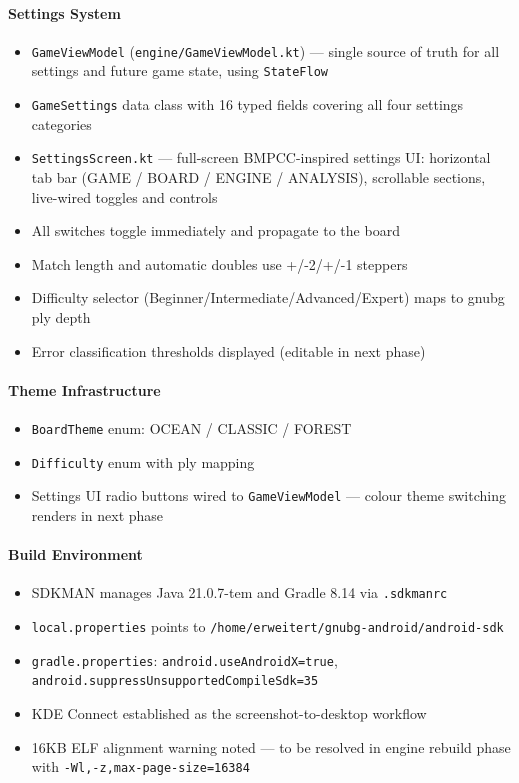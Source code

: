 \documentclass[11pt,a4paper]{article}
\providecommand{\tightlist}{\setlength{\itemsep}{2pt}\setlength{\parskip}{0pt}}
\begin{document}
\paragraph{Settings System}\label{settings-system}

\begin{itemize}
\tightlist
\item
  \texttt{GameViewModel} (\texttt{engine/GameViewModel.kt}) ---
  single source of truth for all settings and future game state,
  using \texttt{StateFlow}
\item
  \texttt{GameSettings} data class with 16 typed fields covering all
  four settings categories
\item
  \texttt{SettingsScreen.kt} --- full-screen BMPCC-inspired settings
  UI: horizontal tab bar (GAME / BOARD / ENGINE / ANALYSIS),
  scrollable sections, live-wired toggles and controls
\item
  All switches toggle immediately and propagate to the board
\item
  Match length and automatic doubles use +/-2/+/-1 steppers
\item
  Difficulty selector (Beginner/Intermediate/Advanced/Expert) maps to
  gnubg ply depth
\item
  Error classification thresholds displayed (editable in next phase)
\end{itemize}

\paragraph{Theme Infrastructure}\label{theme-infrastructure}

\begin{itemize}
\tightlist
\item
  \texttt{BoardTheme} enum: OCEAN / CLASSIC / FOREST
\item
  \texttt{Difficulty} enum with ply mapping
\item
  Settings UI radio buttons wired to \texttt{GameViewModel} ---
  colour theme switching renders in next phase
\end{itemize}

\paragraph{Build Environment}\label{build-environment-v091}

\begin{itemize}
\tightlist
\item
  SDKMAN manages Java 21.0.7-tem and Gradle 8.14 via
  \texttt{.sdkmanrc}
\item
  \texttt{local.properties} points to
  \texttt{/home/erweitert/gnubg-android/android-sdk}
\item
  \texttt{gradle.properties}: \texttt{android.useAndroidX=true},
  \texttt{android.suppressUnsupportedCompileSdk=35}
\item
  KDE Connect established as the screenshot-to-desktop workflow
\item
  16KB ELF alignment warning noted --- to be resolved in engine
  rebuild phase with \texttt{-Wl,-z,max-page-size=16384}
\end{itemize}
\end{document}
